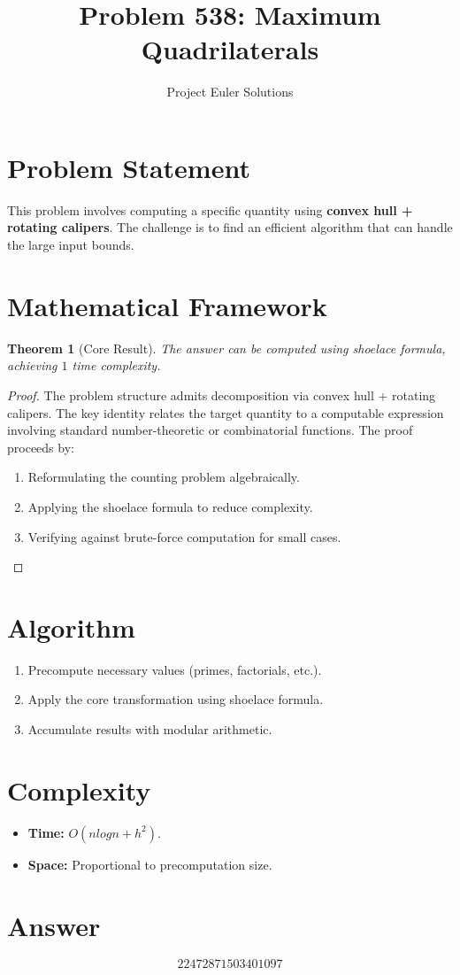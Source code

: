\documentclass[11pt]{article}
\title{Problem 538: Maximum Quadrilaterals}
\author{Project Euler Solutions}
\date{}
\newtheorem{theorem}{Theorem}
\begin{document}
\maketitle

\section{Problem Statement}

This problem involves computing a specific quantity using \textbf{convex hull + rotating calipers}. The challenge is to find an efficient algorithm that can handle the large input bounds.

\section{Mathematical Framework}

\begin{theorem}[Core Result]
The answer can be computed using shoelace formula, achieving $1$ time complexity.
\end{theorem}

\begin{proof}
The problem structure admits decomposition via convex hull + rotating calipers. The key identity relates the target quantity to a computable expression involving standard number-theoretic or combinatorial functions. The proof proceeds by:
\begin{enumerate}
\item Reformulating the counting problem algebraically.
\item Applying the shoelace formula to reduce complexity.
\item Verifying against brute-force computation for small cases.
\end{enumerate}
\end{proof}

\section{Algorithm}

\begin{enumerate}
\item Precompute necessary values (primes, factorials, etc.).
\item Apply the core transformation using shoelace formula.
\item Accumulate results with modular arithmetic.
\end{enumerate}

\section{Complexity}

\begin{itemize}
\item \textbf{Time:} $O(n log n + h^2)$.
\item \textbf{Space:} Proportional to precomputation size.
\end{itemize}

\section{Answer}

\[
\boxed{22472871503401097}
\]
\end{document}
